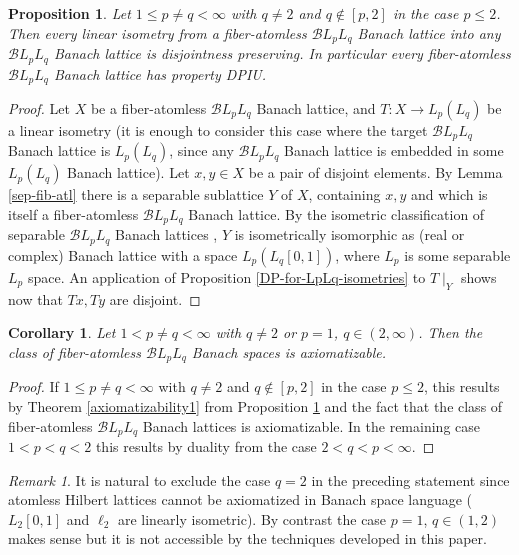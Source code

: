 \documentclass[11pt]{amsart}
\theoremstyle{plain}
\newtheorem{corollary}[theorem]{Corollary}
\newtheorem{proposition}[theorem]{Proposition}
\theoremstyle{remark}
\newtheorem{remark}[theorem]{Remark}
\begin{document}
\begin{proposition}\label{fiber-atomless-DPIU}
Let $1\le p\ne q<\infty$ with $q\ne 2$ and $q\not\in [p,2]$ in the case  $p\le 2$. Then every linear isometry from a fiber-atomless $\mathcal BL_pL_q$ Banach lattice into any $\mathcal BL_pL_q$ Banach lattice is disjointness preserving. In particular every fiber-atomless $\mathcal BL_pL_q$ Banach lattice has property DPIU.
\end{proposition}

\begin{proof}
Let $X$ be a fiber-atomless $\mathcal BL_pL_q$ Banach lattice, and $T: X\to L_p(L_q)$ be a linear isometry (it is enough to consider this case where the target $\mathcal BL_pL_q$ Banach lattice is $L_p(L_q)$, since any $\mathcal BL_pL_q$ Banach lattice is embedded in some $L_p(L_q)$ Banach lattice). Let $x,y\in X$ be a pair of disjoint elements. By Lemma \ref{sep-fib-atl} there is a separable sublattice $Y$ of $X$, containing $x,y$ and which is itself a fiber-atomless $\mathcal BL_pL_q$ Banach lattice.  By the isometric classification of separable $\mathcal BL_pL_q$ Banach lattices \cite[p. 207]{HR}, $Y$ is  isometrically isomorphic as (real or complex) Banach lattice with a space $L_p(L_q[0,1])$, where $L_p$ is some separable $L_p$ space. An application of Proposition \ref{DP-for-LpLq-isometries} to $T\mid_Y$ shows now that $Tx, Ty$ are disjoint.
\end{proof}

\begin{corollary}
Let $1< p\ne q<\infty$ with $q\ne 2$ or $p=1$, $q\in(2,\infty)$. Then the class of fiber-atomless $\mathcal BL_pL_q$ Banach spaces is axiomatizable. 
\end{corollary} 

\begin{proof}
If $1\le p\ne q<\infty$ with $q\ne 2$ and $q\not\in [p,2]$ in the case  $p\le 2$, this results by Theorem \ref{axiomatizability1} from Proposition \ref{fiber-atomless-DPIU} and the fact that the class of fiber-atomless $\mathcal BL_pL_q$ Banach lattices is axiomatizable. In the remaining case $1<p<q<2$ this results by duality from the case $2<q<p<\infty$. 
\end{proof}

\begin{remark}
It is natural to exclude the case $q=2$ in the preceding statement since atomless Hilbert lattices cannot be axiomatized in Banach space language ($L_2[0,1]$ and $\ell_2$ are linearly isometric). By contrast the case $p=1$, $q\in (1,2)$ makes sense but it is not accessible by the techniques developed in this paper.
\end{remark}
\end{document}
